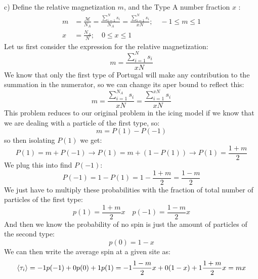 \documentclass[12pt]{article}
\begin{document}
\subsection{}
c) Define the relative magnetization $m$, and the Type A number fraction $x$ :
\begin{align*}
m & =\frac{\mathcal{M}}{N_{A}}=\frac{\sum_{i=1}^{N} s_{i}}{N_{A}}=\frac{\sum_{i=1}^{N} s_{i}}{x N} ; \quad-1 \leq m \leq 1  \tag{1}\\
x & =\frac{N_{A}}{N} ; \quad 0 \leq x \leq 1 \tag{2}
\end{align*}
Let us first consider the expression for the relative magnetization:
\begin{equation}
  m =\frac{\sum_{i=1}^{N} s_{i}}{x N} 
\end{equation}
We know that only the first type of Portugal will make any contribution to the summation in the numerator, so we can change its aper bound to reflect this:
\begin{equation}
  m =\frac{\sum_{i=1}^{N_{A}} s_{i}}{x N} = \frac{\sum_{i=1}^{xN} s_{i}}{x N}
\end{equation}
This problem reduces to our original problem in the icing model if we know that we are dealing with a particle of the first type, so:
\begin{equation}
  m = P(1) - P(-1)
\end{equation}
so then isolating $P(1)$ we get:
\begin{equation}
  P(1) = m + P(-1) \rightarrow P(1) = m + (1 - P(1)) \rightarrow P(1) = \frac{1 + m}{2}
\end{equation}
We plug this into find $P(-1)$:
\begin{equation}
  P(-1) = 1 - P(1) = 1 - \frac{1 + m}{2} = \frac{1 - m}{2}
\end{equation}
We just have to multiply these probabilities with the fraction of total number of particles of the first type:
\begin{equation}
  p(1) = \frac{1 + m}{2}x \quad p(-1) = \frac{1 - m}{2}x
\end{equation}
And then we know the probability of no spin is just the amount of particles of the second type:
\begin{equation}
  p(0) = 1 - x
\end{equation}
We can then write the average spin at a given site as:
\begin{equation}
  \expval{\tau_{i}} = -1p(-1) + 0p(0) + 1p(1) = -1\frac{1 - m}{2}x + 0(1 - x) + 1\frac{1 + m}{2}x = m x
\end{equation} 
\end{document}

